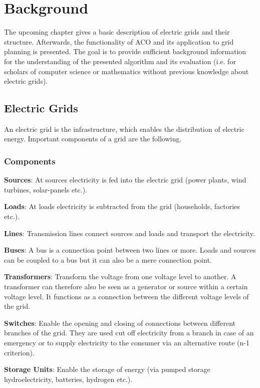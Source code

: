 \chapter{Background}\label{chap:background}
The upcoming chapter gives a basic description of electric grids and their structure. Afterwards, the functionality of ACO and its application to grid planning is presented. The goal is to provide sufficient background information for the understanding of the presented algorithm and its evaluation (i.e. for scholars of computer science or mathematics without previous knowledge about electric grids).

\section{Electric Grids}
An electric grid is the infrastructure, which enables the distribution of electric energy. Important components of a grid are the following.

\subsection{Components}\label{sec:components}

\textbf{Sources}: At sources electricity is fed into the electric grid (power plants, wind turbines, solar-panels etc.).

\textbf{Loads}: At loads electricity is subtracted from the grid (households, factories etc.).

\textbf{Lines}: Transmission lines connect sources and loads and transport the electricity.

\textbf{Buses}: A bus is a connection point between two lines or more. Loads and sources can be coupled to a bus but it can also be a mere connection point.

\textbf{Transformers}: Transform the voltage from one voltage level to another. A transformer can therefore also be seen as a generator or source within a certain voltage level. It functions as a connection between the different voltage levels of the grid.

\textbf{Switches}: Enable the opening and closing of connections between different branches of the grid. They are used cut off electricity from a branch in case of an emergency or to supply electricity to the consumer via an alternative route (n-1 criterion).

\textbf{Storage Units}: Enable the storage of energy (via pumped storage hydroelectricity, batteries, hydrogen etc.). 


